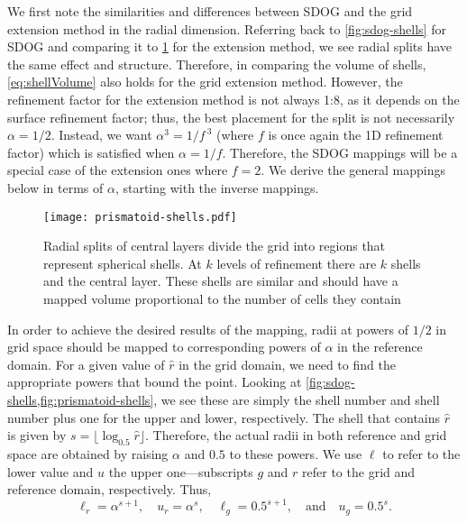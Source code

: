 We first note the similarities and differences between SDOG and the grid extension method in the radial dimension.
Referring back to \cref{fig:sdog-shells} for SDOG and comparing it to \cref{fig:prismatoid-shells} for the extension method, we see radial splits have the same effect and structure.
Therefore, in comparing the volume of shells, \cref{eq:shellVolume} also holds for the grid extension method.
However, the refinement factor for the extension method is not always 1:8, as it depends on the surface refinement factor; thus, the best placement for the split is not necessarily $\alpha = 1/2$.
Instead, we want $\alpha^3 = 1 / f^{\ 3}$ (where $f$ is once again the 1D refinement factor) which is satisfied when $\alpha = 1/f$.
Therefore, the SDOG mappings will be a special case of the extension ones where $f = 2$.
We derive the general mappings below in terms of $\alpha$, starting with the inverse mappings.


\begin{figure}[ht!]
	\centering
	\texttt{[image: prismatoid-shells.pdf]}
	\caption[Spherical shells that result from the grid extension method]{
		Radial splits of central layers divide the grid into regions that represent spherical shells.
		At $k$ levels of refinement there are $k$ shells and the central layer.
		These shells are similar and should have a mapped volume proportional to the number of cells they contain
	}
	\label{fig:prismatoid-shells}
\end{figure}

In order to achieve the desired results of the mapping, radii at powers of $1/2$ in grid space should be mapped to corresponding powers of $\alpha$ in the reference domain.
For a given value of $\hat{r}$ in the grid domain, we need to find the appropriate powers that bound the point.
Looking at \cref{fig:sdog-shells,fig:prismatoid-shells}, we see these are simply the shell number and shell number plus one for the upper and lower, respectively.
The shell that contains $\hat{r}$ is given by $s = \lfloor \log_{0.5} \hat{r} \rfloor$.
Therefore, the actual radii in both reference and grid space are obtained by raising $\alpha$ and $0.5$ to these powers.
We use $\ell$ to refer to the lower value and $u$ the upper one---subscripts $g$ and $r$ refer to the grid and reference domain, respectively.
Thus,
%
\begin{equation*}
\ell_r = \alpha^{s + 1}, \quad u_r = \alpha^s, \quad \ell_g = 0.5^{s + 1}, \quad \text{and} \quad u_g = 0.5^s.
\end{equation*}
%

